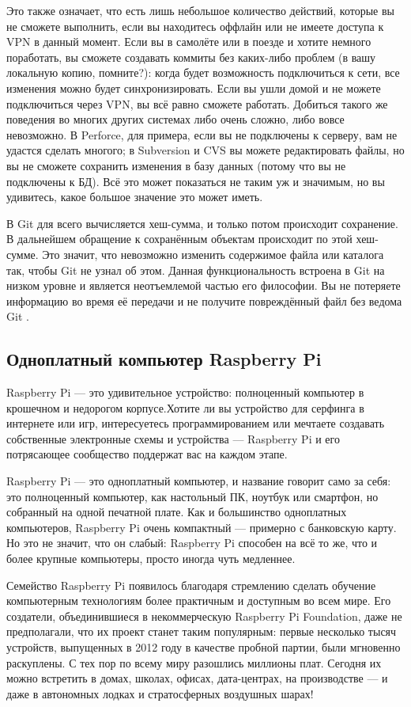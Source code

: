 Это также означает, что есть лишь небольшое количество действий, которые вы не сможете выполнить, если вы находитесь оффлайн или не имеете доступа к VPN в данный момент. Если вы в самолёте или в поезде и хотите немного поработать, вы сможете создавать коммиты без каких-либо проблем (в вашу локальную копию, помните?): когда будет возможность подключиться к сети, все изменения можно будет синхронизировать. Если вы ушли домой и не можете подключиться через VPN, вы всё равно сможете работать.
Добиться такого же поведения во многих других системах либо очень сложно, либо вовсе
невозможно. В Perforce, для примера, если вы не подключены к серверу, вам не удастся
сделать многого; в Subversion и CVS вы можете редактировать файлы, но вы не сможете
сохранить изменения в базу данных (потому что вы не подключены к БД). Всё это может
показаться не таким уж и значимым, но вы удивитесь, какое большое значение это может
иметь.

В Git для всего вычисляется хеш-сумма, и только потом происходит сохранение. В
дальнейшем обращение к сохранённым объектам происходит по этой хеш-сумме. Это
значит, что невозможно изменить содержимое файла или каталога так, чтобы Git не узнал
об этом. Данная функциональность встроена в Git на низком уровне и является
неотъемлемой частью его философии. Вы не потеряете информацию во время её передачи и
не получите повреждённый файл без ведома Git \cite{ProGit}.

\subsection{Одноплатный компьютер Raspberry Pi}

Raspberry Pi — это удивительное устройство: полноценный компьютер в крошечном и недорогом корпусе.Хотите ли вы устройство для серфинга в интернете или игр, интересуетесь программированием или мечтаете создавать собственные электронные схемы и устройства — Raspberry Pi и его потрясающее сообщество поддержат вас на каждом этапе.

Raspberry Pi — это одноплатный компьютер, и название говорит само за себя:
это полноценный компьютер, как настольный ПК, ноутбук или смартфон, но собранный на одной печатной плате. Как и большинство одноплатных компьютеров, Raspberry Pi очень компактный — примерно с банковскую карту. Но это не значит, что он слабый: Raspberry Pi способен на всё то же, что и более крупные компьютеры, просто иногда чуть медленнее.

Семейство Raspberry Pi появилось благодаря стремлению сделать обучение компьютерным технологиям более практичным и доступным во всем мире. Его создатели, объединившиеся в некоммерческую Raspberry Pi Foundation, даже не предполагали, что их проект станет таким популярным: первые несколько тысяч устройств, выпущенных в 2012 году в качестве пробной партии, были мгновенно раскуплены. С тех пор по всему миру разошлись миллионы плат. Сегодня их можно встретить в домах, школах, офисах, дата-центрах, на производстве — и даже в автономных лодках и стратосферных воздушных шарах!

